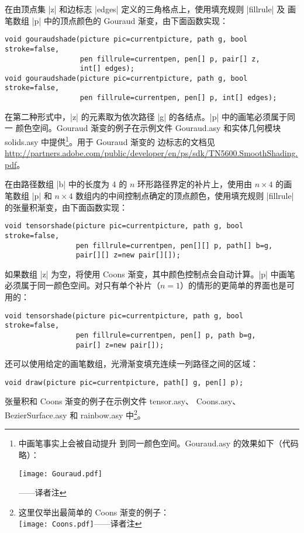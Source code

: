 \documentclass{ctexbook}
\newcommand*\prgname[1]{\textsf{#1}}
\newcommand\transnote[1]{\footnote{#1——译者注}}
\begin{document}
在由顶点集 |z| 和边标志 |edges| 定义的三角格点上，使用填充规则 |fillrule| 及
画笔数组 |p| 中的顶点颜色的 Gouraud 渐变，由下面函数实现：
\begin{lstlisting}
void gouraudshade(picture pic=currentpicture, path g, bool stroke=false,
                  pen fillrule=currentpen, pen[] p, pair[] z,
                  int[] edges);
void gouraudshade(picture pic=currentpicture, path g, bool stroke=false,
                  pen fillrule=currentpen, pen[] p, int[] edges);
\end{lstlisting}
在第二种形式中，|z| 的元素取为依次路径 |g| 的各结点。|p| 中的画笔必须属于同一
颜色空间。Gouraud 渐变的例子在示例文件 \prgname{Gouraud.asy} 和实体几何模块
\prgname{solids.asy} 中提供\transnote{ 中画笔事实上会被自动提升
到同一颜色空间。\prgname{Gouraud.asy} 的效果如下（代码略）：\\
\centerline{\texttt{[image: Gouraud.pdf]}}}。用于 Gouraud 渐变的
边标志的文档见
\url{http://partners.adobe.com/public/developer/en/ps/sdk/TN5600.SmoothShading.pdf}。

在由路径数组 |b| 中的长度为 4 的 $n$ 环形路径界定的补片上，使用由 $n\times4$
的画笔数组 |p| 和 $n\times4$ 数组内的中间控制点确定的顶点颜色，使用填充规则
|fillrule| 的张量积渐变，由下面函数实现：
\begin{lstlisting}
void tensorshade(picture pic=currentpicture, path g, bool stroke=false,
                 pen fillrule=currentpen, pen[][] p, path[] b=g,
                 pair[][] z=new pair[][]);
\end{lstlisting}
如果数组 |z| 为空，将使用 Coons 渐变，其中颜色控制点会自动计算。|p| 中画笔
必须属于同一颜色空间。对只有单个补片（$n=1$）的情形的更简单的界面也是可用的：
\begin{lstlisting}
void tensorshade(picture pic=currentpicture, path g, bool stroke=false,
                 pen fillrule=currentpen, pen[] p, path b=g,
                 pair[] z=new pair[]);
\end{lstlisting}
还可以使用给定的画笔数组，光滑渐变填充连续一列路径之间的区域：
\begin{lstlisting}
void draw(picture pic=currentpicture, path[] g, pen[] p);
\end{lstlisting}
张量积和 Coons 渐变的例子在示例文件 \prgname{tensor.asy}、
\prgname{Coons.asy}、\prgname{BezierSurface.asy} 和 \prgname{rainbow.asy}
中\transnote{这里仅举出最简单的 Coons 渐变的例子：\\
\vbox{}%
\texttt{[image: Coons.pdf]}\box0}。
\end{document}
